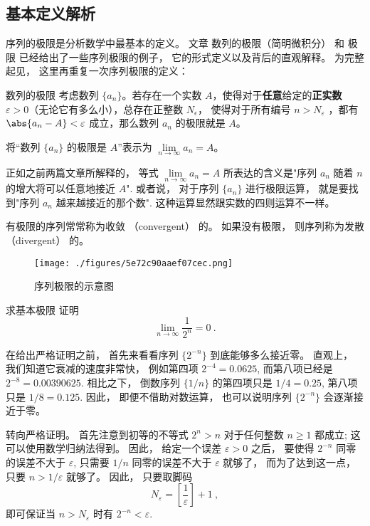 
\begin{issues}
\end{issues}


\subsection{基本定义解析}

序列的极限是分析数学中最基本的定义。 文章 数列的极限（简明微积分） 和 极限 已经给出了一些序列极限的例子， 它的形式定义以及背后的直观解释。 为完整起见， 这里再重复一次序列极限的定义：

\begin{definition}{数列的极限}
考虑数列 $\{a_n\}$。若存在一个实数 $A$，使得对于\textbf{任意}给定的\textbf{正实数} $\varepsilon > 0$（无论它有多么小），总存在正整数 $N_\epsilon$， 使得对于所有编号 $n>N_\varepsilon$ ，都有 $\abs{a_n - A} < \varepsilon$ 成立，那么数列 $a_n$ 的极限就是 $A$。

将“数列 $\{a_n\}$ 的极限是 $A$”表示为 $\lim\limits_{n\to\infty}a_n=A$。
\end{definition}

正如之前两篇文章所解释的， 等式 $\lim\limits_{n\to\infty}a_n=A$ 所表达的含义是"序列 $a_n$ 随着 $n$ 的增大将可以任意地接近 $A$". 或者说， 对于序列 $\{a_n\}$ 进行极限运算， 就是要找到"序列 $a_n$ 越来越接近的那个数". 这种运算显然跟实数的四则运算不一样。

有极限的序列常常称为收敛 （convergent） 的。 如果没有极限， 则序列称为发散 （divergent） 的。
\begin{figure}[ht]
\centering
\texttt{[image: ./figures/5e72c90aaef07cec.png]}
\caption{序列极限的示意图} \label{fig_SeqLim_1}
\end{figure}
\begin{example}{求基本极限}
证明$$\lim\limits_{n\to\infty}\frac{1}{2^n}=0~.$$

在给出严格证明之前， 首先来看看序列 $\{2^{-n}\}$ 到底能够多么接近零。 直观上， 我们知道它衰减的速度非常快， 例如第四项 $2^{-4}=0.0625$, 而第八项已经是 $2^{-8}=0.00390625$. 相比之下， 倒数序列 $\{1/n\}$ 的第四项只是 $1/4=0.25$, 第八项只是 $1/8=0.125$. 因此， 即便不借助对数运算， 也可以说明序列 $\{2^{-n}\}$ 会逐渐接近于零。

转向严格证明。 首先注意到初等的不等式 $2^n>n$ 对于任何整数 $n\geq1$ 都成立; 这可以使用数学归纳法得到。 因此， 给定一个误差 $\varepsilon>0$ 之后， 要使得 $2^{-n}$ 同零的误差不大于 $\varepsilon$, 只需要 $1/n$ 同零的误差不大于 $\varepsilon$ 就够了， 而为了达到这一点， 只要 $n>1/\varepsilon$ 就够了。 因此， 只要取脚码
$$
N_\varepsilon=\left[\frac{1}{\varepsilon}\right]+1~,
$$
即可保证当 $n>N_\varepsilon$ 时有 $2^{-n}<\varepsilon$.
\end{example}

